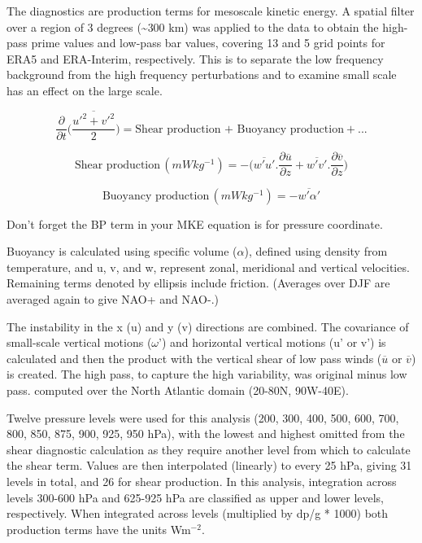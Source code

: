 The diagnostics are production terms for mesoscale kinetic energy. A spatial filter over a region of 3 degrees (\textasciitilde{300} km) was applied to the data to obtain the high-pass prime values and low-pass bar values, covering 13 and 5 grid points for ERA5 and ERA-Interim, respectively. This is to separate the low frequency background from the high frequency perturbations and to examine small scale has an effect on the large scale. 

\begin{equation} \label{eq_diag1}
\frac{\partial}{\partial{t}} \Bigg(\frac{\overline{u'^2 + v'^2}}{2}\Bigg) = \text{Shear production + Buoyancy production} + ... 
\end{equation}

\begin{equation} \label{eq_diag2}
\text{Shear production} \,(mWkg^{-1}) = -\Bigg({\overline{w'u'} . \frac{\partial{\overline u}}{\partial z} + \overline{w'v'} . \frac{\partial{\overline v}}{\partial z}}\Bigg)
\end{equation}

\begin{equation} \label{eq_diag3}
\text{Buoyancy production} \,(mWkg^{-1}) = {-\overline{w'\alpha'}}
\end{equation}

Don’t forget the BP term in your MKE equation is for pressure coordinate.

Buoyancy is calculated using specific volume ($\alpha$), defined using density from temperature, and u, v, and w, represent zonal, meridional and vertical velocities. Remaining terms denoted by ellipsis include friction. (Averages over DJF are averaged again to give NAO+ and NAO-.)

The instability in the x (u) and y (v) directions are combined. The covariance of small-scale vertical motions ($\omega$') and horizontal vertical motions (u' or v') is calculated and then the  product with the vertical shear of low pass winds ($\overline{u}$ or $\overline{v}$)  is created. The high pass, to capture the high variability, was original minus low pass. 
computed over the North Atlantic domain (20-80N, 90W-40E).

Twelve pressure levels were used for this analysis (200, 300, 400, 500, 600, 700, 800, 850, 875, 900, 925, 950 hPa), with the lowest and highest omitted from the shear diagnostic calculation as they require another level from which to calculate the shear term. Values are then interpolated (linearly) to every 25 hPa, giving 31 levels in total, and 26 for shear production. In this analysis, integration across levels 300-600 hPa and 625-925 hPa are classified as upper and lower levels, respectively. When integrated across levels (multiplied by dp/g * 1000) both production terms have the units Wm$^{-2}$. 

